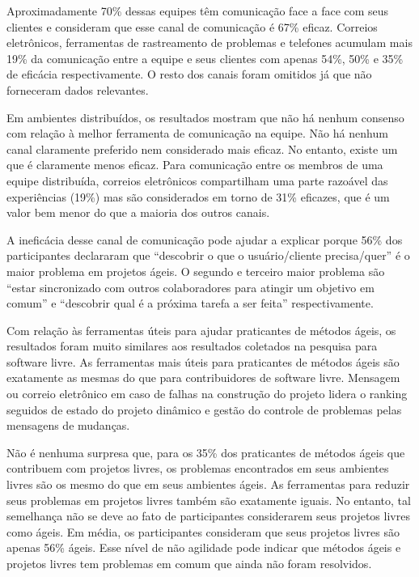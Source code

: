 Aproximadamente 70\% dessas equipes têm comunicação face a face com
seus clientes e consideram que esse canal de comunicação é 67\%
eficaz. Correios eletrônicos, ferramentas de rastreamento de problemas
e telefones acumulam mais 19\% da comunicação entre a equipe e seus
clientes com apenas 54\%, 50\% e 35\% de eficácia respectivamente. O
resto dos canais foram omitidos já que não forneceram dados
relevantes.

Em ambientes distribuídos, os resultados mostram que não há nenhum
consenso com relação à melhor ferramenta de comunicação na equipe. Não
há nenhum canal claramente preferido nem considerado mais eficaz. No
entanto, existe um que é claramente menos eficaz. Para comunicação
entre os membros de uma equipe distribuída, correios eletrônicos
compartilham uma parte razoável das experiências (19\%) mas são
considerados em torno de 31\% eficazes, que é um valor bem menor do
que a maioria dos outros canais.

A ineficácia desse canal de comunicação pode ajudar a explicar porque
56\% dos participantes declararam que ``descobrir o que o
usuário/cliente precisa/quer'' é o maior problema em projetos ágeis. O
segundo e terceiro maior problema são ``estar sincronizado com outros
colaboradores para atingir um objetivo em comum'' e ``descobrir qual é
a próxima tarefa a ser feita'' respectivamente.

Com relação às ferramentas úteis para ajudar praticantes de métodos
ágeis, os resultados foram muito similares aos resultados coletados na
pesquisa para software livre. As ferramentas mais úteis para
praticantes de métodos ágeis são exatamente as mesmas do que para
contribuidores de software livre. Mensagem ou correio eletrônico em
caso de falhas na construção do projeto lidera o ranking seguidos de
estado do projeto dinâmico e gestão do controle de problemas pelas
mensagens de mudanças.

Não é nenhuma surpresa que, para os 35\% dos praticantes de métodos
ágeis que contribuem com projetos livres, os problemas encontrados em
seus ambientes livres são os mesmo do que em seus ambientes ágeis. As
ferramentas para reduzir seus problemas em projetos livres também são
exatamente iguais. No entanto, tal semelhança não se deve ao fato de
participantes considerarem seus projetos livres como ágeis. Em média,
os participantes consideram que seus projetos livres são apenas 56\%
ágeis. Esse nível de não agilidade pode indicar que métodos ágeis e
projetos livres tem problemas em comum que ainda não foram resolvidos.

